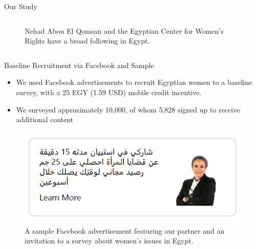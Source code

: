 \documentclass[10pt]{beamer}
\begin{document}
\begin{frame}{Our Study}
\begin{columns}[T]
\begin{column}{0.5\textwidth}
\begin{figure}
\caption{\scriptsizeptsize Nehad Abou El Qomsan and the Egyptian Center for Women's Rights have a broad following in Egypt.} \end{figure} 
\end{column}
\end{columns}
\end{frame}

\begin{frame}{Baseline Recruitment via Facebook and Sample}
\begin{itemize}
    \item We used Facebook advertisements to recruit Egyptian women to a baseline survey, with a 25 EGY (1.59 USD) mobile credit incentive.
    \item We surveyed approximately 10,000, of whom 5,828 signed up to receive additional content
\end{itemize}
\begin{figure}
\includegraphics[height = 0.4\textwidth]{Recruit_Intervention/FB_ad_example.png}\captionsetup{font=small, width = 0.9\linewidth}
\caption{\scriptsizeptsize A sample Facebook advertisement featuring our partner and an invitation to a survey about women's issues in Egypt.} \end{figure} 
\end{frame}
\end{document}
